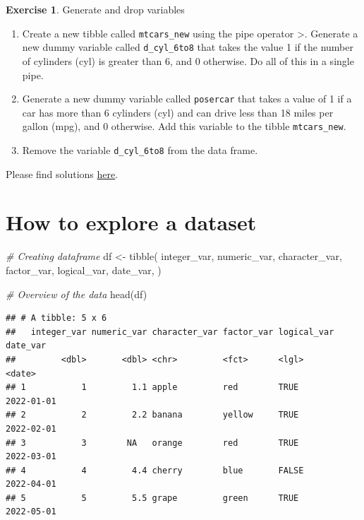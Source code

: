\documentclass[
  12pt,
  oneside]{book}
\newenvironment{Shaded}{\begin{snugshade}}{\end{snugshade}}
\newcommand{\CommentTok}[1]{\textcolor[rgb]{0.56,0.35,0.01}{\textit{#1}}}
\newcommand{\FunctionTok}[1]{\textcolor[rgb]{0.00,0.00,0.00}{#1}}
\newcommand{\NormalTok}[1]{#1}
\newcommand{\OtherTok}[1]{\textcolor[rgb]{0.56,0.35,0.01}{#1}}
\theoremstyle{definition}
\theoremstyle{definition}
\theoremstyle{definition}
\newtheorem{exercise}{Exercise}[chapter]
\theoremstyle{definition}
\theoremstyle{remark}
\begin{document}
\begin{exercise}
\protect\hypertarget{exr:genanddrop}{}\label{exr:genanddrop}Generate and drop variables

\begin{enumerate}
\def\labelenumi{\alph{enumi})}
\item
  Create a new tibble called \texttt{mtcars\_new} using the pipe operator \textbar\textgreater. Generate a new dummy variable called \texttt{d\_cyl\_6to8} that takes the value 1 if the number of cylinders (cyl) is greater than 6, and 0 otherwise. Do all of this in a single pipe.
\item
  Generate a new dummy variable called \texttt{posercar} that takes a value of 1 if a car has more than 6 cylinders (cyl) and can drive less than 18 miles per gallon (mpg), and 0 otherwise. Add this variable to the tibble \texttt{mtcars\_new}.
\item
  Remove the variable \texttt{d\_cyl\_6to8} from the data frame.
\end{enumerate}

Please find solutions \href{https://raw.githubusercontent.com/hubchev/courses/main/scr/exe_genanddrop.R}{here}.
\end{exercise}

\hypertarget{how-to-explore-a-dataset}{%
\section{How to explore a dataset}\label{how-to-explore-a-dataset}}

\begin{Shaded}
\begin{Highlighting}[]
\CommentTok{\# Creating dataframe}
\NormalTok{df }\OtherTok{\textless{}{-}} \FunctionTok{tibble}\NormalTok{(}
\NormalTok{  integer\_var, numeric\_var, character\_var, factor\_var, logical\_var, date\_var,}
\NormalTok{  )}

\CommentTok{\# Overview of the data}
\FunctionTok{head}\NormalTok{(df)}
\end{Highlighting}
\end{Shaded}

\begin{verbatim}
## # A tibble: 5 x 6
##   integer_var numeric_var character_var factor_var logical_var date_var  
##         <dbl>       <dbl> <chr>         <fct>      <lgl>       <date>    
## 1           1         1.1 apple         red        TRUE        2022-01-01
## 2           2         2.2 banana        yellow     TRUE        2022-02-01
## 3           3        NA   orange        red        TRUE        2022-03-01
## 4           4         4.4 cherry        blue       FALSE       2022-04-01
## 5           5         5.5 grape         green      TRUE        2022-05-01
\end{verbatim}
\end{document}
